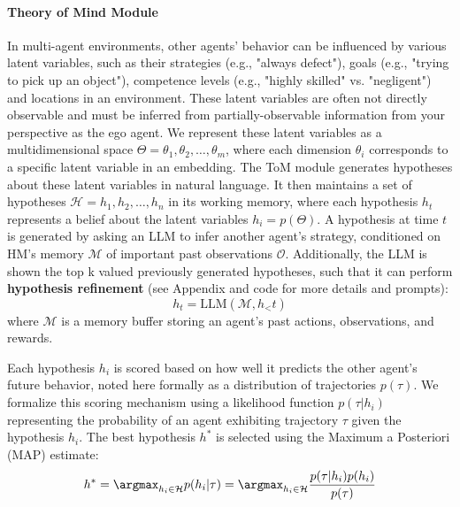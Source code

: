 \documentclass{article} %
\begin{document}
\paragraph{Theory of Mind Module}
In multi-agent environments, other agents' behavior can be influenced by various latent variables, such as their strategies (e.g., "always defect"), goals (e.g., "trying to pick up an object"), competence levels (e.g., "highly skilled" vs. "negligent") and locations in an environment. These latent variables are often not directly observable and must be inferred from partially-observable information from your perspective as the ego agent. We represent these latent variables as a multidimensional space $\Theta = {\theta_1, \theta_2, \ldots, \theta_m}$, where each dimension $\theta_i$ corresponds to a specific latent variable in an embedding. The ToM module generates hypotheses about these latent variables in natural language. It then maintains  a set of hypotheses $\mathcal{H} = {h_1, h_2, \ldots, h_n}$ in its working memory, where each hypothesis $h_t$ represents a belief about the latent variables $h_i=p(\Theta)$. A hypothesis at time $t$ is generated by asking an LLM to infer another agent's strategy, conditioned on HM's memory $\mathcal{M}$ of important past observations $\mathcal{O}$. Additionally, the LLM is shown the top k valued previously generated hypotheses, such that it can perform \textbf{hypothesis refinement} (see Appendix and code for more details and prompts):
\begin{equation}
h_t = \text{LLM}(\mathcal{M}, h_<t)
\end{equation}
where $\mathcal{M}$ is a memory buffer storing an agent's past actions, observations, and rewards.

Each hypothesis $h_i$ is scored based on how well it predicts the other agent's future behavior, noted here formally as a distribution of trajectories $p(\tau)$. We formalize this scoring mechanism using a likelihood function $p(\tau | h_i)$ representing the probability of an agent exhibiting trajectory $\tau$ given the hypothesis $h_i$. The best hypothesis $h^*$ is selected using the Maximum a Posteriori (MAP) estimate:
\vspace{-5pt}
\begin{equation}
h^* = \argmax_{h_i \in \mathcal{H}} p(h_i | \tau) = \argmax_{h_i \in \mathcal{H}} \frac{p(\tau | h_i) p(h_i)}{p(\tau)}
\end{equation}
\end{document}
